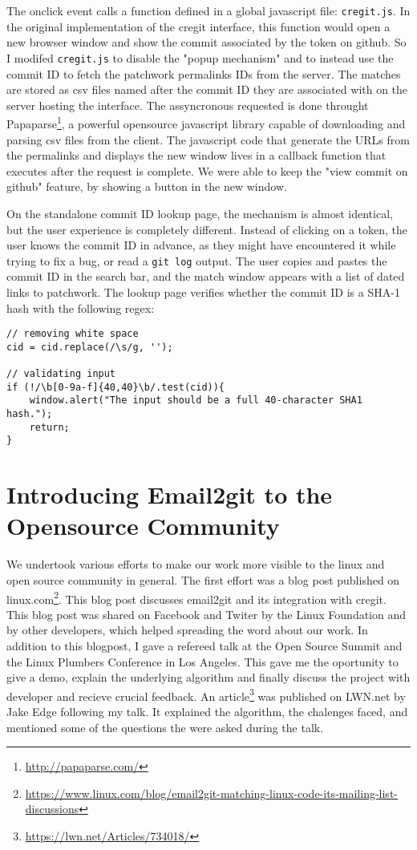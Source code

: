 The onclick event calls a function defined in a global javascript file: \texttt{cregit.js}. In the original implementation of the cregit interface, this function would open a new browser window and show the commit associated by the token on github. So I modifed \texttt{cregit.js} to disable the "popup mechanism" and to instead use the commit ID to fetch the patchwork permalinks IDs from the server. The matches are stored as csv files named after the commit ID they are associated with on the server hosting the interface. The assyncronous requested is done throught Papaparse\footnote{\url{http://papaparse.com/}}, a powerful opensource javascript library capable of downloading and parsing csv files from the client. The javascript code that generate the URLs from the permalinks and displays the new window lives in a callback function that executes after the request is complete. We were able to keep the "view commit on github" feature, by showing a button in the new window.  

On the standalone commit ID lookup page, the mechanism is almost identical, but the user experience is completely different. Instead of clicking on a token, the user knows the commit ID in advance, as they might have encountered it while trying to fix a bug, or read a \texttt{git log} output. The user copies and pastes the commit ID in the search bar, and the match window appears with a list of dated links to patchwork. The lookup page verifies whether the commit ID is a SHA-1 hash with the following regex:

\begin{lstlisting}
// removing white space
cid = cid.replace(/\s/g, '');

// validating input
if (!/\b[0-9a-f]{40,40}\b/.test(cid)){
    window.alert("The input should be a full 40-character SHA1 hash.");
    return;
}
\end{lstlisting}



\section{Introducing Email2git to the Opensource Community}

We undertook various efforts to make our work more visible to the linux and open source community in general. The first effort was a blog post published on linux.com\footnote{\url{https://www.linux.com/blog/email2git-matching-linux-code-its-mailing-list-discussions}}. This blog post discusses email2git and its integration with cregit. This blog post was shared on Facebook and Twiter by the Linux Foundation and by other developers, which helped spreading the word about our work. In addition to this blogpost, I gave a refereed talk at the Open Source Summit and the Linux Plumbers Conference in Los Angeles. This gave me the oportunity to give a demo, explain the underlying algorithm and finally discuss the project with developer and recieve crucial feedback. An article\footnote{\url{https://lwn.net/Articles/734018/}} was published on LWN.net by Jake Edge following my talk. It explained the algorithm, the chalenges faced, and mentioned some of the questions the were asked during the talk.



